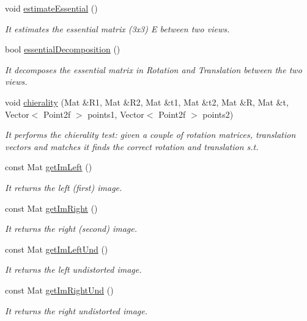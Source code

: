 \begin{DoxyCompactItemize}
void \hyperlink{classStereoCamera_ab2eded08bca185ac22cd6343cb4c85c8}{estimate\+Essential} ()
\begin{DoxyCompactList}\small\item\em It estimates the essential matrix (3x3) E between two views. \end{DoxyCompactList}\item 
bool \hyperlink{classStereoCamera_a180388e93b654802c7c56c18d206214b}{essential\+Decomposition} ()
\begin{DoxyCompactList}\small\item\em It decomposes the essential matrix in Rotation and Translation between the two views. \end{DoxyCompactList}\item 
void \hyperlink{classStereoCamera_a245346dbef63e13807c5cd9160803d25}{chierality} (Mat \&R1, Mat \&R2, Mat \&t1, Mat \&t2, Mat \&R, Mat \&t, Vector$<$ Point2f $>$ points1, Vector$<$ Point2f $>$ points2)
\begin{DoxyCompactList}\small\item\em It performs the chierality test\+: given a couple of rotation matrices, translation vectors and matches it finds the correct rotation and translation s.\+t. \end{DoxyCompactList}\item 
const Mat \hyperlink{classStereoCamera_a57d155d519c621a7a580f41ec114df01}{get\+Im\+Left} ()
\begin{DoxyCompactList}\small\item\em It returns the left (first) image. \end{DoxyCompactList}\item 
const Mat \hyperlink{classStereoCamera_a09e72c3430250883aac6ab5a4d98961f}{get\+Im\+Right} ()
\begin{DoxyCompactList}\small\item\em It returns the right (second) image. \end{DoxyCompactList}\item 
const Mat \hyperlink{classStereoCamera_a48ff47fc8326d511677bef8bcf3a65bc}{get\+Im\+Left\+Und} ()
\begin{DoxyCompactList}\small\item\em It returns the left undistorted image. \end{DoxyCompactList}\item 
const Mat \hyperlink{classStereoCamera_a0485caf9bd52a7317776e5db495446a5}{get\+Im\+Right\+Und} ()
\begin{DoxyCompactList}\small\item\em It returns the right undistorted image. \end{DoxyCompactList}\item 

\end{DoxyCompactItemize}
